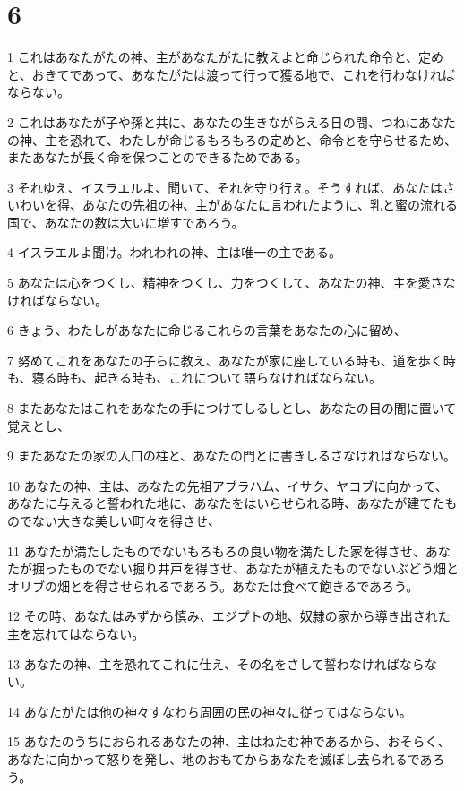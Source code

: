 \chapter{6}

\par 1 これはあなたがたの神、主があなたがたに教えよと命じられた命令と、定めと、おきてであって、あなたがたは渡って行って獲る地で、これを行わなければならない。
\par 2 これはあなたが子や孫と共に、あなたの生きながらえる日の間、つねにあなたの神、主を恐れて、わたしが命じるもろもろの定めと、命令とを守らせるため、またあなたが長く命を保つことのできるためである。
\par 3 それゆえ、イスラエルよ、聞いて、それを守り行え。そうすれば、あなたはさいわいを得、あなたの先祖の神、主があなたに言われたように、乳と蜜の流れる国で、あなたの数は大いに増すであろう。
\par 4 イスラエルよ聞け。われわれの神、主は唯一の主である。
\par 5 あなたは心をつくし、精神をつくし、力をつくして、あなたの神、主を愛さなければならない。
\par 6 きょう、わたしがあなたに命じるこれらの言葉をあなたの心に留め、
\par 7 努めてこれをあなたの子らに教え、あなたが家に座している時も、道を歩く時も、寝る時も、起きる時も、これについて語らなければならない。
\par 8 またあなたはこれをあなたの手につけてしるしとし、あなたの目の間に置いて覚えとし、
\par 9 またあなたの家の入口の柱と、あなたの門とに書きしるさなければならない。
\par 10 あなたの神、主は、あなたの先祖アブラハム、イサク、ヤコブに向かって、あなたに与えると誓われた地に、あなたをはいらせられる時、あなたが建てたものでない大きな美しい町々を得させ、
\par 11 あなたが満たしたものでないもろもろの良い物を満たした家を得させ、あなたが掘ったものでない掘り井戸を得させ、あなたが植えたものでないぶどう畑とオリブの畑とを得させられるであろう。あなたは食べて飽きるであろう。
\par 12 その時、あなたはみずから慎み、エジプトの地、奴隷の家から導き出された主を忘れてはならない。
\par 13 あなたの神、主を恐れてこれに仕え、その名をさして誓わなければならない。
\par 14 あなたがたは他の神々すなわち周囲の民の神々に従ってはならない。
\par 15 あなたのうちにおられるあなたの神、主はねたむ神であるから、おそらく、あなたに向かって怒りを発し、地のおもてからあなたを滅ぼし去られるであろう。
